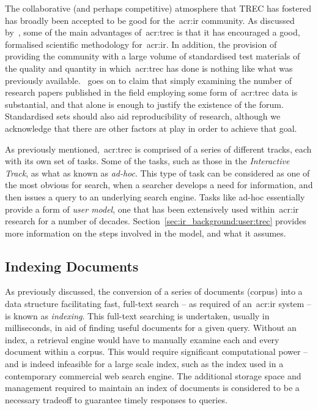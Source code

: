 The collaborative (and perhaps competitive) atmosphere that TREC has fostered has broadly been accepted to be good for the~\gls{acr:ir} community. As discussed by~\cite{robertson2008history_ir_evaluation}, some of the main advantages of~\gls{acr:trec} is that it has encouraged a good, formalised scientific methodology for~\gls{acr:ir}. In addition, the provision of providing the community with a large volume of standardised test materials of the quality and quantity in which~\gls{acr:trec} has done is nothing like what was previously available.~\cite{robertson2008history_ir_evaluation} goes on to claim that simply examining the number of research papers published in the field employing some form of~\gls{acr:trec} data is substantial, and that alone is enough to justify the existence of the forum. Standardised sets should also aid reproducibility of research, although we acknowledge that there are other factors at play in order to achieve that goal. 

As previously mentioned,~\gls{acr:trec} is comprised of a series of different tracks, each with its own set of tasks. Some of the tasks, such as those in the \emph{Interactive Track}, as what as known as \emph{ad-hoc}. This type of task can be considered as one of the most obvious for search, when a searcher develops a need for information, and then issues a query to an underlying search engine. Tasks like ad-hoc essentially provide a form of \emph{user model}, one that has been extensively used within~\gls{acr:ir} research for a number of decades. Section~\ref{sec:ir_background:user:trec} provides more information on the steps involved in the model, and what it assumes.

\subsection{Indexing Documents}\label{sec:ir_background:basics:indexing}
As previously discussed, the conversion of a series of documents (corpus) into a data structure facilitating fast, full-text search -- as required of an~\gls{acr:ir} system -- is known as \emph{indexing}. This full-text searching is undertaken, usually in milliseconds, in aid of finding useful documents for a given query. Without an index, a retrieval engine would have to manually examine each and every document within a corpus. This would require significant computational power -- and is indeed infeasible for a large scale index, such as the index used in a contemporary commercial web search engine. The additional storage space and management required to maintain an index of documents is considered to be a necessary tradeoff to guarantee timely responses to queries.

